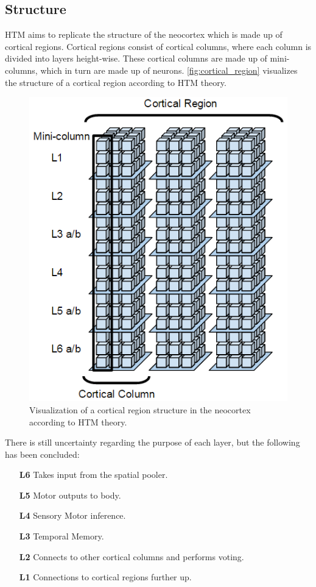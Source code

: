 \subsection{Structure}
HTM aims to replicate the structure of the neocortex which is made up of cortical regions. Cortical regions consist of cortical columns, where each column is divided into layers height-wise. These cortical columns are made up of mini-columns, which in turn are made up of neurons. \autoref{fig:cortical_region} visualizes the structure of a cortical region according to HTM theory.
\begin{figure}[H]
    \centering
    \includegraphics[width=\textwidth]{resources/related_works/cortical_region}
    \caption{Visualization of a cortical region structure in the neocortex according to HTM theory.}
    \label{fig:cortical_region}
\end{figure}
There is still uncertainty regarding the purpose of each layer, but the following has been concluded\cite{htm_l2_l3,cortical_region}:
\begin{itemize}
    \item[\textbf{L6}] Takes input from the spatial pooler.
    \item[\textbf{L5}] Motor outputs to body.
    \item[\textbf{L4}] Sensory Motor inference.
    \item[\textbf{L3}] Temporal Memory.
    \item[\textbf{L2}] Connects to other cortical columns and performs voting.
    \item[\textbf{L1}] Connections to cortical regions further up.
\end{itemize}
